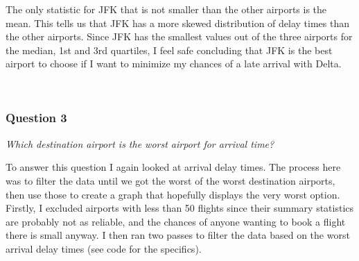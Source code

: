 \documentclass[]{article}
\begin{document}
The only statistic for JFK that is not smaller than the other airports
is the mean. This tells us that JFK has a more skewed distribution of
delay times than the other airports. Since JFK has the smallest values
out of the three airports for the median, 1st and 3rd quartiles, I feel
safe concluding that JFK is the best airport to choose if I want to
minimize my chances of a late arrival with Delta.

\(~\)

\subsubsection{Question 3}\label{question-3}

\emph{Which destination airport is the worst airport for arrival time?}

To answer this question I again looked at arrival delay times. The
process here was to filter the data until we got the worst of the worst
destination airports, then use those to create a graph that hopefully
displays the very worst option. Firstly, I excluded airports with less
than 50 flights since their summary statistics are probably not as
reliable, and the chances of anyone wanting to book a flight there is
small anyway. I then ran two passes to filter the data based on the
worst arrival delay times (see code for the specifics).
\end{document}
